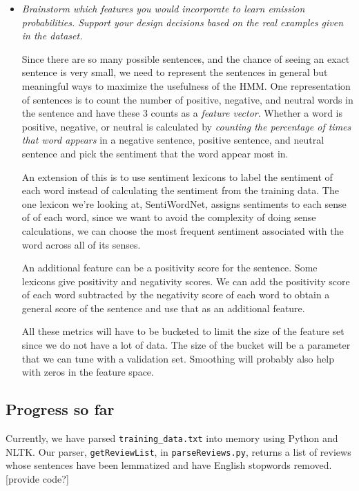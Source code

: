 \documentclass{article}
\begin{document}
\begin{itemize}
\item \textit{Brainstorm which features you would incorporate to learn emission probabilities. Support your design decisions based on the real examples given
in the dataset.}\par

Since there are so many possible sentences, and the chance of seeing an exact sentence is very small, we need to represent the sentences in general but meaningful ways to maximize the usefulness of the HMM. One representation of sentences is to count the number of positive, negative, and neutral words in the sentence and have these 3 counts as a \emph{feature vector}. Whether a word is positive, negative, or neutral is calculated by \emph{counting the percentage of times that word appears} in a negative sentence, positive sentence, and neutral sentence and pick the sentiment that the word appear most in.

An extension of this is to use sentiment lexicons to label the sentiment of each word instead of calculating the sentiment from the training data. The one lexicon we're looking at, SentiWordNet, assigns sentiments to each sense of of each word, since we want to avoid the complexity of doing sense calculations, we can choose the most frequent sentiment associated with the word across all of its senses.

An additional feature can be a positivity score for the sentence. Some lexicons give positivity and negativity scores. We can add the positivity score of each word subtracted by the negativity score of each word to obtain a general score of the sentence and use that as an additional feature.

All these metrics will have to be bucketed to limit the size of the feature set since we do not have a lot of data. The size of the bucket will be a parameter that we can tune with a validation set. Smoothing will probably also help with zeros in the feature space.
\end{itemize}

\subsection*{Progress so far}
Currently, we have parsed \texttt{training\_data.txt} into memory using Python and NLTK. Our parser, \texttt{getReviewList}, in \texttt{parseReviews.py}, returns a list of reviews whose sentences have been lemmatized and have English stopwords removed. [provide code?]
\end{document}
